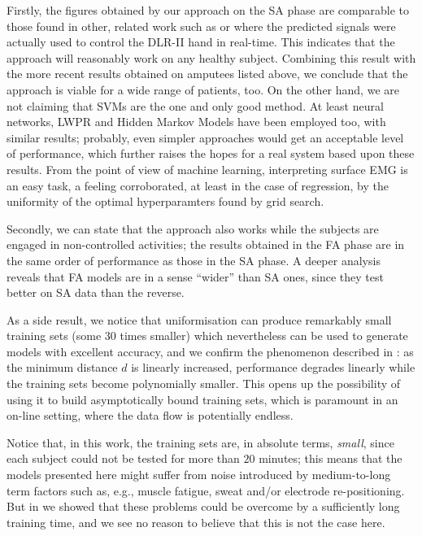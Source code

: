 \documentclass[10pt]{bmc_article}
\newenvironment{bmcformat}{\begin{raggedright}\baselineskip20pt\sloppy\setboolean{publ}{false}}{\end{raggedright}\baselineskip20pt\sloppy}
\begin{document}
\begin{bmcformat}
Firstly, the figures obtained by our approach on the SA phase are
comparable to those found in other, related work such as
\cite{ramos,cipriani} or \cite{2008.BioCyb} where the predicted signals
were actually used to control the DLR-II hand in real-time. This
indicates that the approach will reasonably work on any healthy subject.
Combining this result with the more recent results obtained on amputees
listed above, we conclude that the approach is viable for a wide range
of patients, too. On the other hand, we are not claiming that SVMs are the one and only
good method. At least neural networks, LWPR \cite{lwpr} and Hidden Markov
Models \cite{chan2005} have been employed too, with similar results; probably,
even simpler approaches would get an acceptable level of performance,
which further raises the hopes for a real system based upon these
results. From the point of view of machine learning, interpreting surface
EMG is an easy task, a feeling corroborated, at least in the case of
regression, by the uniformity of the optimal hyperparamters found by
grid search.

Secondly, we can state that the approach also works while the subjects
are engaged in non-controlled activities; the results obtained in the
FA phase are in the same order of performance as those in the SA phase.
A deeper analysis reveals that FA models are in a sense ``wider'' than
SA ones, since they test better on SA data than the reverse.

As a side result, we notice that uniformisation can produce remarkably
small training sets (some $30$ times smaller) which nevertheless can be
used to generate models with excellent accuracy, and we confirm
the phenomenon described in \cite{2008.BioCyb}: as the minimum distance
$d$ is linearly increased, performance degrades linearly
while the training sets become polynomially smaller. This opens up the
possibility of using it to build asymptotically bound training sets,
which is paramount in an on-line setting, where the data flow is
potentially endless.

Notice that, in this work, the training sets
are, in absolute terms, \emph{small}, since each subject could not be
tested for more than $20$ minutes; this means that the models presented
here might suffer from noise introduced by medium-to-long term factors
such as, e.g., muscle fatigue, sweat and/or electrode re-positioning.
But in \cite{2008.BioCyb} we showed that these problems could be overcome
by a sufficiently long training time, and we see no reason to believe that
this is not the case here.


\end{bmcformat}
\end{document}
